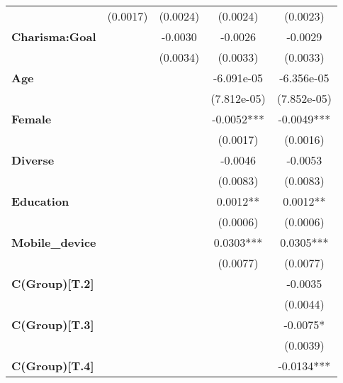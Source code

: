 \begin{center}
\begin{tabular}{lcccc}
\textbf{ }                     &     (0.0017)     &     (0.0024)     &     (0.0024)     &     (0.0023)      \\
\textbf{Charisma:Goal}         &                  &     -0.0030      &     -0.0026      &     -0.0029       \\
\textbf{ }                     &                  &     (0.0034)     &     (0.0033)     &     (0.0033)      \\
\textbf{Age}                   &                  &                  &    -6.091e-05    &    -6.356e-05     \\
\textbf{ }                     &                  &                  &   (7.812e-05)    &   (7.852e-05)     \\
\textbf{Female}                &                  &                  &    -0.0052***    &    -0.0049***     \\
\textbf{ }                     &                  &                  &     (0.0017)     &     (0.0016)      \\
\textbf{Diverse}               &                  &                  &     -0.0046      &     -0.0053       \\
\textbf{ }                     &                  &                  &     (0.0083)     &     (0.0083)      \\
\textbf{Education}             &                  &                  &     0.0012**     &     0.0012**      \\
\textbf{ }                     &                  &                  &     (0.0006)     &     (0.0006)      \\
\textbf{Mobile\_device}        &                  &                  &    0.0303***     &    0.0305***      \\
\textbf{ }                     &                  &                  &     (0.0077)     &     (0.0077)      \\
\textbf{C(Group)[T.2]}         &                  &                  &                  &     -0.0035       \\
\textbf{ }                     &                  &                  &                  &     (0.0044)      \\
\textbf{C(Group)[T.3]}         &                  &                  &                  &     -0.0075*      \\
\textbf{ }                     &                  &                  &                  &     (0.0039)      \\
\textbf{C(Group)[T.4]}         &                  &                  &                  &    -0.0134***     \\

\end{tabular}
\end{center}
